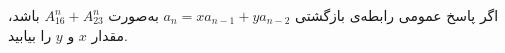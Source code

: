\EXERCISE
اگر پاسخ عمومی رابطه‌ی بازگشتی
$a_n = xa_{n-1} + ya_{n-2}$
به‌صورت
$A_16^n + A_23^n$
باشد، مقدار
$x$
و
$y$
را بیابید.